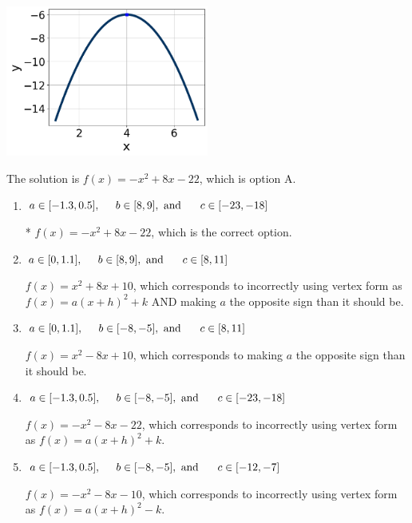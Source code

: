 \documentclass{extbook}[14pt]
\begin{document}
\begin{enumerate}
{\begin{center}
    \includegraphics[width=0.5\textwidth]{../Figures/quadraticGraphToEquationCopyC.png}
\end{center}


The solution is \( f(x) = -x^{2} +8 x -22 \), which is option A.\begin{enumerate}[label=\Alph*.]
\item \( a \in [-1.3, 0.5], \hspace*{5mm} b \in [8, 9], \text{ and } \hspace*{5mm} c \in [-23, -18] \)

* $f(x)=-x^{2} +8 x -22$, which is the correct option.
\item \( a \in [0, 1.1], \hspace*{5mm} b \in [8, 9], \text{ and } \hspace*{5mm} c \in [8, 11] \)

$f(x)=x^{2} +8 x + 10$, which corresponds to incorrectly using vertex form as $f(x) = a(x+h)^2+k$ AND making $a$ the opposite sign than it should be.
\item \( a \in [0, 1.1], \hspace*{5mm} b \in [-8, -5], \text{ and } \hspace*{5mm} c \in [8, 11] \)

$f(x)=x^{2} -8 x + 10$, which corresponds to making $a$ the opposite sign than it should be.
\item \( a \in [-1.3, 0.5], \hspace*{5mm} b \in [-8, -5], \text{ and } \hspace*{5mm} c \in [-23, -18] \)

$f(x)=-x^{2} -8 x -22$, which corresponds to incorrectly using vertex form as $f(x) = a(x+h)^2+k$.
\item \( a \in [-1.3, 0.5], \hspace*{5mm} b \in [-8, -5], \text{ and } \hspace*{5mm} c \in [-12, -7] \)

$f(x)=-x^{2} -8 x -10$, which corresponds to incorrectly using vertex form as $f(x) = a(x+h)^2 - k$.
\end{enumerate}

}
\end{enumerate}
\end{document}
